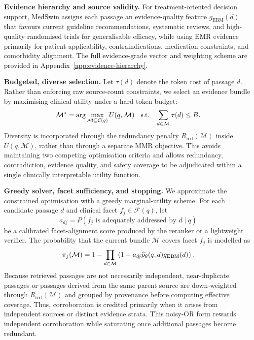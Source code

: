 \documentclass[conference]{IEEEtran}
\begin{document}
\textbf{Evidence hierarchy and source validity.}
For treatment-oriented decision support, MedSwin assigns each passage an evidence-quality feature $g_{\mathrm{EBM}}(d)$ that favours current guideline recommendations, systematic reviews, and high-quality randomised trials for generalisable efficacy, while using EMR evidence primarily for patient applicability, contraindications, medication constraints, and comorbidity alignment. The full evidence-grade vector and weighting scheme are provided in Appendix~\ref{app:evidence-hierarchy}.


\textbf{Budgeted, diverse selection.}
Let $\tau(d)$ denote the token cost of passage $d$. Rather than enforcing raw source-count constraints, we select an evidence bundle by maximising clinical utility under a hard token budget:
\begin{equation}
\label{eq:budgeted-utility-selection}
\small
\mathcal{M}^{\star}
=
\arg\max_{\mathcal{M}\subseteq\mathcal{C}(q)}
U(q,\mathcal{M})
\quad
\text{s.t.}
\quad
\sum_{d\in\mathcal{M}}\tau(d)\le B.
\end{equation}
Diversity is incorporated through the redundancy penalty $R_{\mathrm{red}}(\mathcal{M})$ inside $U(q,\mathcal{M})$, rather than through a separate MMR objective. This avoids maintaining two competing optimisation criteria and allows redundancy, contradiction, evidence quality, and safety coverage to be adjudicated within a single clinically interpretable utility function.

\textbf{Greedy solver, facet sufficiency, and stopping.}
We approximate the constrained optimisation with a greedy marginal-utility scheme. For each candidate passage $d$ and clinical facet $f_j\in\mathcal{F}(q)$, let
\[
a_{dj}=P(f_j \text{ is adequately addressed by } d\mid q)
\]
be a calibrated facet-alignment score produced by the reranker or a lightweight verifier. The probability that the current bundle $\mathcal{M}$ covers facet $f_j$ is modelled as
\begin{equation}
\label{eq:facet-coverage}
\small
\pi_j(\mathcal{M})
=
1-\prod_{d\in\mathcal{M}}
\left(
1-a_{dj}\widehat{p}_\theta(q,d)g_{\mathrm{EBM}}(d)
\right).
\end{equation}
Because retrieved passages are not necessarily independent, near-duplicate passages or passages derived from the same parent source are down-weighted through $R_{\mathrm{red}}(\mathcal{M})$ and grouped by provenance before computing effective coverage. Thus, corroboration is credited primarily when it arises from independent sources or distinct evidence strata.
This noisy-OR form rewards independent corroboration while saturating once additional passages become redundant.
\end{document}
